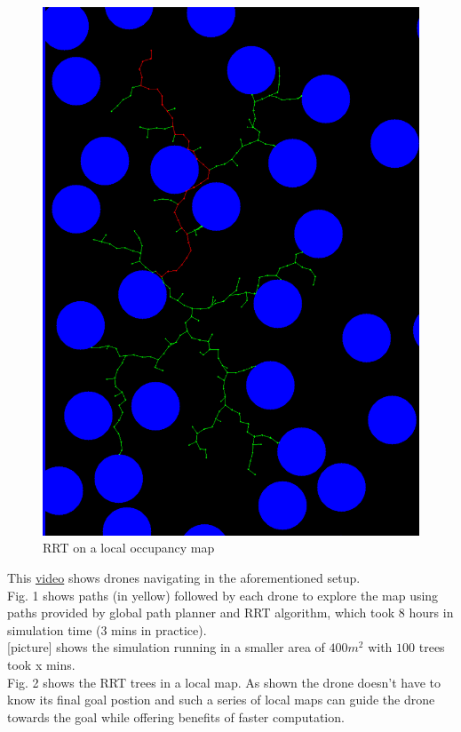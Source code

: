 \begin{figure}[h]
\centering
\includegraphics[scale=0.25]{images/rrt_drone_1_iter_6.png}
\caption{RRT on a local occupancy map}
\end{figure}



This \href{https://www.youtube.com/watch?v=JBWNEh0Fis4&ab_channel=ShantnavAgarwal}{video} shows drones navigating in the aforementioned setup.\\

Fig. 1 shows paths (in yellow) followed by each drone to explore the map using paths provided by global path planner and RRT algorithm, which took 8 hours in simulation time (3 mins in practice). \\

[picture] shows the simulation running in a smaller area of $400m^2$ with $100$ trees took x mins. \\

Fig. 2 shows the RRT trees in a local map. As shown the drone doesn't have to know its final goal postion and such a series of local maps can guide the drone towards the goal while offering benefits of faster computation.